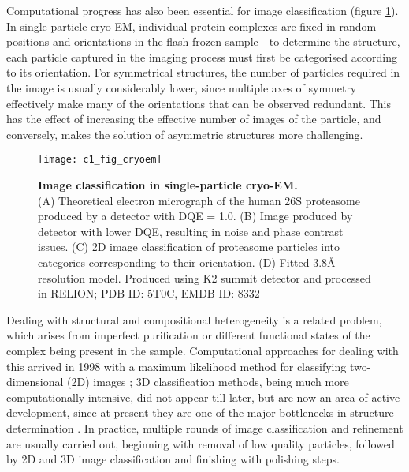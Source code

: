 \documentclass[a4paper,11pt,twoside,openright]{scrbook}
\begin{document}
Computational progress has also been essential for image classification (figure \ref{figure:cryoem}). In single-particle cryo-EM, individual protein complexes are fixed in random positions and orientations in the flash-frozen sample - to determine the structure, each particle captured in the imaging process must first be categorised according to its orientation. For symmetrical structures, the number of particles required in the image is usually considerably lower, since multiple axes of symmetry effectively make many of the orientations that can be observed redundant. This has the effect of increasing the effective number of images of the particle, and conversely, makes the solution of asymmetric structures more challenging.

\begin{figure}
    \texttt{[image: c1\_fig\_cryoem]}
    \caption[Image classification in single-particle cryo-EM]{\sffamily \textbf{Image classification in single-particle cryo-EM.} \\ \small (A) Theoretical electron micrograph of the human 26S proteasome produced by a detector with DQE = 1.0. (B) Image produced by detector with lower DQE, resulting in noise and phase contrast issues. (C) 2D image classification of proteasome particles into categories corresponding to their orientation. (D) Fitted 3.8Å resolution model. Produced using K2 summit detector and processed in RELION; PDB ID: 5T0C, EMDB ID: 8332 \cite{Chen2016}}
    \label{figure:cryoem}
\end{figure}

Dealing with structural and compositional heterogeneity is a related problem, which arises from imperfect purification or different functional states of the complex being present in the sample. Computational approaches for dealing with this arrived in 1998 with a maximum likelihood method for classifying two-dimensional (2D) images \cite{Sigworth1998}; 3D classification methods, being much more computationally intensive, did not appear till later, but are now an area of active development, since at present they are one of the major bottlenecks in structure determination \cite{Scheres2007,Lyumkis2013,Punjani2017}. In practice, multiple rounds of image classification and refinement are usually carried out, beginning with removal of low quality particles, followed by 2D and 3D image classification and finishing with polishing steps.
\end{document}
